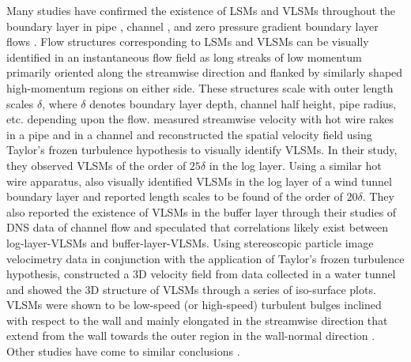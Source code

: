 Many studies have confirmed the existence of LSMs and VLSMs throughout the boundary layer in pipe \citep{monty_jfm_07,guala_adrian_jfm2006,baltzer_jfm_13}, channel \citep{monty_jfm_07,balakumar_adrian_ptrs_07,lee_sung_jfm_14,hutchins_marusic_jfm2007,fang2015blm}, and zero pressure gradient boundary layer flows \citep{balakumar_adrian_ptrs_07,Lee_sung_jfm11,hutchins_marusic_jfm2007}. Flow structures corresponding to LSMs and VLSMs can be visually identified in an instantaneous flow field as long streaks of low momentum primarily oriented along the streamwise direction and flanked by similarly shaped high-momentum regions on either side. These structures scale with outer length scales $\delta$, where $\delta$ denotes boundary layer depth, channel half height, pipe radius, etc. depending upon the flow. \citet{monty_jfm_07} measured streamwise velocity with hot wire rakes in a pipe and in a channel and reconstructed the spatial velocity field using Taylor's frozen turbulence hypothesis to visually identify VLSMs. In their study, they observed VLSMs of the order of $25\delta$ in the log layer. Using a similar hot wire apparatus, \citet{hutchins_marusic_jfm2007} also visually identified VLSMs in the log layer of a wind tunnel boundary layer and reported length scales to be found of the order of $20\delta$. They also reported the existence of VLSMs in the buffer layer through their studies of DNS data of channel flow and speculated that correlations likely exist between log-layer-VLSMs and buffer-layer-VLSMs. Using stereoscopic particle image velocimetry data in conjunction with the application of Taylor's frozen turbulence hypothesis, \citet{dennis_nickels_jfm2011} constructed a 3D velocity field from data collected in a water tunnel and showed the 3D structure of VLSMs through a series of iso-surface plots. VLSMs were shown to be low-speed (or high-speed) turbulent bulges inclined with respect to the wall and mainly elongated in the streamwise direction that extend from the wall towards the outer region in the wall-normal direction \citep{dennis_nickels_jfm2011}. Other studies have come to similar conclusions \citep{chung_jfm_10_large,kerherv_roux_etfs_2017}. 

